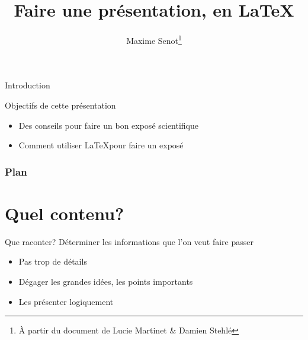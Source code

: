 \documentclass[12pt]{beamer}
\title[Faire une présentation, en LaTex]{Faire une présentation, en \LaTeX}
\author[M. Senot]{Maxime Senot\footnote{À partir du document de Lucie Martinet \& Damien Stehlé}}
\institute{Lycée EIB \'Etoile -- Paris\\
T\textsuperscript{ale} --- Projet de programmation%
}
\begin{document}

\begin{frame}
  \titlepage
\end{frame}


\begin{frame}{Introduction}
  \begin{exampleblock}{Objectifs de cette présentation}
  \begin{itemize}
    \item Des conseils pour faire un bon exposé scientifique
    \item Comment utiliser \LaTeX pour faire un exposé
  \end{itemize}
  \end{exampleblock}
\end{frame}


\begin{frame}
  \frametitle{Plan}
  \tableofcontents
\end{frame}

\section{Quel contenu?}

\begin{frame}{Que raconter?}
  Déterminer les informations que l'on veut faire passer
  \begin{itemize}
    \item Pas trop de détails
    \item Dégager les grandes idées, les points importants 
    \item Les présenter logiquement
  \end{itemize}

  \bigskip

\end{frame}

\end{document}
